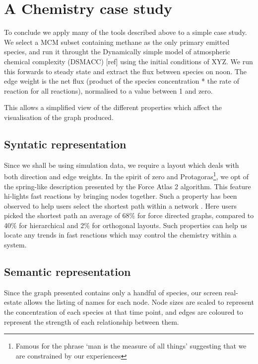 \section{A Chemistry case study}\label{sec:chemcase}
To conclude we apply many of the tools described above to a simple case study. We select a MCM subset containing methane as the only primary emitted species, and run it throught the Dynamically simple model of atmospheric chemical complexity (DSMACC) [ref] using the initial conditions of XYZ. We run this forwards to steady state and extract the flux between species on noon. The edge weight is the net flux (product of the species concentration * the rate of reaction for all reactions), normalised to a value between 1 and zero. 

This allows a simplified view of the different properties which affect the visualisation of the graph produced. 

\subsection{Syntatic representation} 
Since we shall be using simulation data, we require a layout which deals with both direction and edge weights. In the spirit of zero and Protagoras\footnote{Famous for the phrase `man is the measure of all things' suggesting that we are constrained by our experiences}, we opt of the spring-like description presented by the Force Atlas 2 algorithm. This feature hi-lights fast reactions by bringing nodes together. Such a property has been observed to help users select the shortest path within a network \citep{eyetrack}. Here users picked the shortest path an average of 68\% for force directed graphs, compared to 40\% for hierarchical and 2\% for orthogonal layouts. Such properties can help us locate any trends in fast reactions which may control the chemistry within a system. 


\subsection{Semantic representation}
Since the graph presented contains only a handful of species, our screen real-estate allows the listing of names for each node. Node sizes are scaled to represent the concentration of each species at that time point, and edges are coloured to represent the strength of each relationship between them. 


